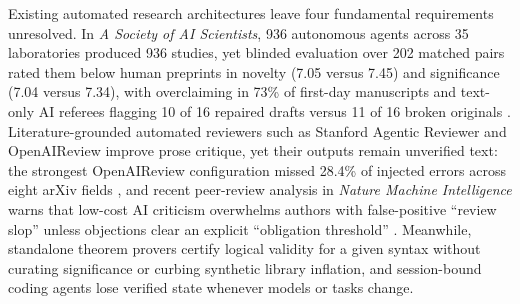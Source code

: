 \documentclass[11pt,a4paper]{article}
\begin{document}
Existing automated research architectures leave four fundamental requirements
unresolved. In \emph{A Society of AI Scientists}, 936 autonomous agents across
35 laboratories produced 936 studies, yet blinded evaluation over 202 matched
pairs rated them below human preprints in novelty (7.05 versus 7.45) and
significance (7.04 versus 7.34), with overclaiming in 73\% of first-day
manuscripts and text-only AI referees flagging 10 of 16 repaired drafts versus
11 of 16 broken originals \citep{societyai}. Literature-grounded automated
reviewers such as Stanford Agentic Reviewer and OpenAIReview improve prose
critique, yet their outputs remain unverified text: the strongest OpenAIReview
configuration missed 28.4\% of injected errors across eight arXiv fields
\citep{stanford,nguyen2026review}, and recent peer-review analysis in
\emph{Nature Machine Intelligence} warns that low-cost AI criticism overwhelms
authors with false-positive ``review slop'' unless objections clear an explicit
``obligation threshold'' \citep{sun2026obligation}. Meanwhile, standalone
theorem provers certify logical validity for a given syntax without curating
significance or curbing synthetic library inflation, and session-bound coding
agents lose verified state whenever models or tasks change.
\end{document}
